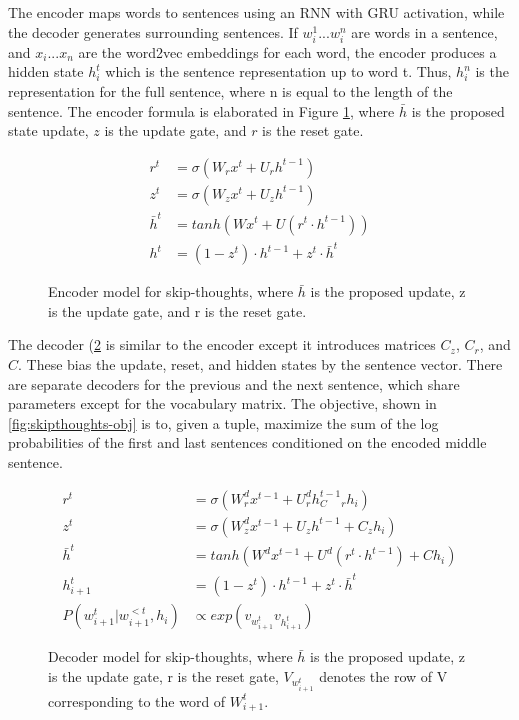 The encoder maps words to sentences using an RNN with GRU activation, while the decoder generates surrounding sentences. If $w_i^1...w_i^n$ are words in a sentence, and $x_i...x_n$ are the word2vec embeddings for each word, the encoder produces a hidden state $h_i^t$ which is the sentence representation up to word t. Thus, $h_i^n$ is the representation for the full sentence, where n is equal to the length of the sentence. The encoder formula is elaborated in Figure \ref{fig:skipthoughts-encoder}, where $\bar h$ is the proposed state update, $z$ is the update gate, and $r$ is the reset gate. 

\begin{figure}[h!]
    \centering
    \begin{align*}
    r^t &= \sigma(W_rx^t + U_r h^{t-1}) \\
    z^t &= \sigma (W_z x^t + U_z h^{t-1}) \\
    \bar h^t &= tanh(Wx^t + U(r^t \cdot h^{t-1})) \\
    h^t &= (1 - z^t) \cdot h^{t-1} + z^t \cdot \bar h ^t
    \end{align*}
    \caption{Encoder model for skip-thoughts, where $\bar h$ is the proposed update, z is the update gate, and r is the reset gate.}
    \label{fig:skipthoughts-encoder}
\end{figure}

The decoder (\ref{fig:skipthoughts-decoder} is similar to the encoder except it introduces matrices $C_z$, $C_r$, and $C$. These bias the update, reset, and hidden states by the sentence vector. There are separate decoders for the previous and the next sentence, which share parameters except for the vocabulary matrix. The objective, shown in \ref{fig:skipthoughts-obj} is to, given a tuple, maximize the sum of the log probabilities of the first and last sentences conditioned on the encoded middle sentence. 

\begin{figure}[h!]
    \centering
    \begin{align*}
    r^t &= \sigma(W_r^d x^{t-1} + U_r^d h^{t-1} _  C_r h_i) \\
    z^t &= \sigma (W_z^d x^{t-1} + U_z h^{t-1} + C_z h_i) \\
    \bar h^t &= tanh(W^d x^{t-1} + U^d(r^t \cdot h^{t-1}) + C h_i) \\
    h^t_{i+1} &= (1 - z^t) \cdot h^{t-1} + z^t \cdot \bar h ^t \\
    P(w^t_{i+1}|w^{<t}_{i+1}, h_i) &\propto exp(v_{w^t_{i+1}}v_{h^t_{i+1}})
    \end{align*}
    \caption{Decoder model for skip-thoughts, where $\bar h$ is the proposed update, z is the update gate, r is the reset gate, $V_{w^t_{i+1}}$ denotes the row of V corresponding to the word of $W^t_{i+1}$.}
    \label{fig:skipthoughts-decoder}
\end{figure}

